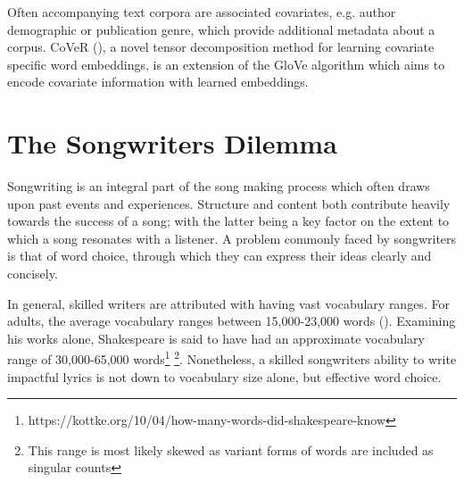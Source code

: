 \noindent
\newline
Often accompanying text corpora are associated covariates, e.g. author demographic or publication genre, which provide additional metadata about a corpus. CoVeR (\cite{Tian2018}), a novel tensor decomposition method for learning covariate specific word embeddings, is an extension of the GloVe algorithm which aims to encode covariate information with learned embeddings.

\section{The Songwriters Dilemma}
Songwriting is an integral part of the song making process which often draws upon past events and experiences. Structure and content both contribute heavily towards the success of a song; with the latter being a key factor on the extent to which a song resonates with a listener. A problem commonly faced by songwriters is that of word choice, through which they can express their ideas clearly and concisely.

\noindent
\newline
In general, skilled writers are attributed with having vast vocabulary ranges. For adults, the average vocabulary ranges between 15,000-23,000 words (\cite{McCrum2011}). Examining his works alone, Shakespeare is said to have had an approximate vocabulary range of 30,000-65,000 words\footnote{https://kottke.org/10/04/how-many-words-did-shakespeare-know} \footnote{This range is most likely skewed as variant forms of words are included as singular counts}. Nonetheless, a skilled songwriters ability to write impactful lyrics is not down to vocabulary size alone, but effective word choice.
 
